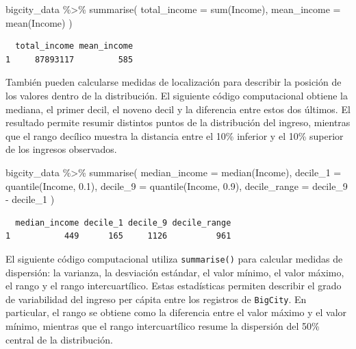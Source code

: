 \documentclass[
  spanish,
  11pt,
  letterpaper,
  oneside,
  open=any]{scrbook}
\newenvironment{Shaded}{\begin{snugshade}}{\end{snugshade}}
\newcommand{\AttributeTok}[1]{\textcolor[rgb]{0.40,0.45,0.13}{#1}}
\newcommand{\FloatTok}[1]{\textcolor[rgb]{0.68,0.00,0.00}{#1}}
\newcommand{\FunctionTok}[1]{\textcolor[rgb]{0.28,0.35,0.67}{#1}}
\newcommand{\NormalTok}[1]{\textcolor[rgb]{0.00,0.23,0.31}{#1}}
\newcommand{\SpecialCharTok}[1]{\textcolor[rgb]{0.37,0.37,0.37}{#1}}
\begin{document}
\begin{Shaded}
\begin{Highlighting}[]
\NormalTok{bigcity\_data }\SpecialCharTok{\%\textgreater{}\%}
  \FunctionTok{summarise}\NormalTok{(}
    \AttributeTok{total\_income =} \FunctionTok{sum}\NormalTok{(Income),}
    \AttributeTok{mean\_income =} \FunctionTok{mean}\NormalTok{(Income)}
\NormalTok{  )}
\end{Highlighting}
\end{Shaded}

\begin{verbatim}
  total_income mean_income
1     87893117         585
\end{verbatim}

También pueden calcularse medidas de localización para describir la
posición de los valores dentro de la distribución. El siguiente código
computacional obtiene la mediana, el primer decil, el noveno decil y la
diferencia entre estos dos últimos. El resultado permite resumir
distintos puntos de la distribución del ingreso, mientras que el rango
decílico muestra la distancia entre el 10\% inferior y el 10\% superior
de los ingresos observados.

\begin{Shaded}
\begin{Highlighting}[]
\NormalTok{bigcity\_data }\SpecialCharTok{\%\textgreater{}\%}
  \FunctionTok{summarise}\NormalTok{(}
    \AttributeTok{median\_income =} \FunctionTok{median}\NormalTok{(Income),}
    \AttributeTok{decile\_1 =} \FunctionTok{quantile}\NormalTok{(Income, }\FloatTok{0.1}\NormalTok{),}
    \AttributeTok{decile\_9 =} \FunctionTok{quantile}\NormalTok{(Income, }\FloatTok{0.9}\NormalTok{),}
    \AttributeTok{decile\_range =}\NormalTok{ decile\_9 }\SpecialCharTok{{-}}\NormalTok{ decile\_1}
\NormalTok{  )}
\end{Highlighting}
\end{Shaded}

\begin{verbatim}
  median_income decile_1 decile_9 decile_range
1           449      165     1126          961
\end{verbatim}

El siguiente código computacional utiliza \texttt{summarise()} para
calcular medidas de dispersión: la varianza, la desviación estándar, el
valor mínimo, el valor máximo, el rango y el rango intercuartílico.
Estas estadísticas permiten describir el grado de variabilidad del
ingreso per cápita entre los registros de \texttt{BigCity}. En
particular, el rango se obtiene como la diferencia entre el valor máximo
y el valor mínimo, mientras que el rango intercuartílico resume la
dispersión del 50\% central de la distribución.
\end{document}
